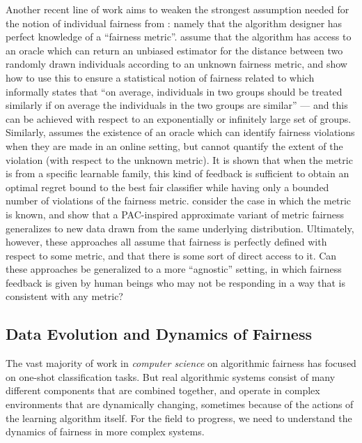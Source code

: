 Another recent line of work aims to weaken the strongest assumption needed for the notion of individual fairness from \cite{awareness}: namely that the algorithm designer has perfect knowledge of a ``fairness metric''. \cite{KRR18} assume that the algorithm has access to an oracle which can return an unbiased estimator for the distance between two randomly drawn individuals according to an unknown fairness metric, and show how to use this to ensure a statistical notion of fairness related to \cite{gerrymandering,multical} which informally states that ``on average, individuals in two groups should be treated similarly if on average the individuals in the two groups are similar'' --- and this can be achieved with respect to an exponentially or infinitely large set of groups. Similarly, \cite{GJKR18} assumes the existence of an oracle which can identify fairness violations when they are made in an online setting, but cannot quantify the extent of the violation (with respect to the unknown metric). It is shown that when the metric is from a specific learnable family, this kind of feedback is sufficient to obtain an optimal regret bound to the best fair classifier while having only a bounded number of violations of the fairness metric. \cite{RY18} consider the case in which the metric is known, and show that a PAC-inspired approximate variant of metric fairness generalizes to new data drawn from the same underlying distribution. Ultimately, however, these approaches all assume that fairness is perfectly defined with respect to some metric, and that there is some sort of direct access to it. Can these approaches be generalized to a more ``agnostic'' setting, in which fairness feedback is given by human beings who may not be responding in a way that is consistent with any metric?


\subsection{Data Evolution and Dynamics of Fairness}
The vast majority of work in \emph{computer science} on algorithmic fairness has focused on one-shot classification tasks. But real algorithmic systems consist of many different components that are combined together, and operate in complex environments that are dynamically changing, sometimes because of the actions of the learning algorithm itself. For the field to progress, we need to understand the dynamics of fairness in more complex systems.

